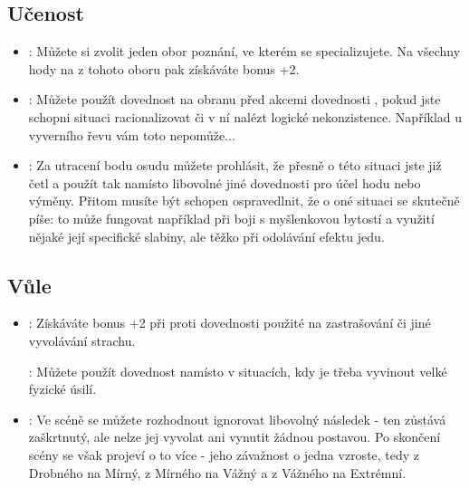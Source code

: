 \documentclass[../main.tex]{subfiles}
\begin{document}
\subsection{Učenost}
\label{sec:trik-ucenost}
\begin{itemize}
  
\item{}:
\label{sec:ucenost-specialista}
Můžete si zvolit jeden obor poznání, ve kterém se specializujete. Na všechny hody na  z tohoto oboru pak získáváte bonus +2.

\item{}:
\label{sec:ucenost-smysl}
Můžete použít dovednost  na obranu před akcemi dovednosti , pokud jste schopni situaci racionalizovat či v ní nalézt logické nekonzistence. Například u vyverního řevu vám toto nepomůže...

\item{}:
\label{sec:ucenost-cetl}
Za utracení bodu osudu můžete prohlásit, že přesně o této situaci jste již četl a použít tak  namísto libovolné jiné dovednosti pro účel hodu nebo výměny. Přitom musíte být schopen ospravedlnit, že o oné situaci se skutečně píše: to může fungovat například při boji s myšlenkovou bytostí a využití nějaké její specifické slabiny, ale těžko při odolávání efektu jedu.
\end{itemize}

\subsection{Vůle}
\label{sec:trik-vule}
\begin{itemize}
  
\item{}
\label{sec:vule-nebojsa}:
Získáváte bonus +2 při  proti dovednosti  použité na zastrašování či jiné vyvolávání strachu.

:
\label{sec:vule-duch}
Můžete použít dovednost  namísto  v situacích, kdy je třeba vyvinout velké fyzické úsilí.

\item{}:
\label{sec:vule-ublizit}
Ve scéně se můžete rozhodnout ignorovat libovolný následek - ten zůstává zaškrtnutý, ale nelze jej vyvolat ani vynutit žádnou postavou. Po skončení scény se však projeví o to více - jeho závažnost o jedna vzroste, tedy z Drobného na Mírný, z Mírného na Vážný a z Vážného na Extrémní.
\end{itemize}
\end{document}
